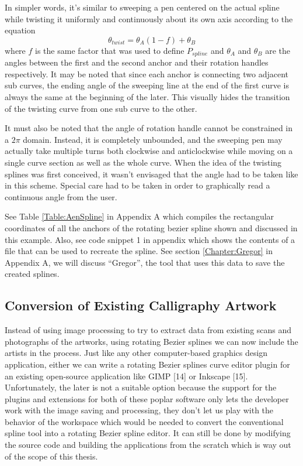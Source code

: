     In simpler words, it’s similar to sweeping a pen centered on the actual spline while twisting it uniformly and continuously about its own axis according to the equation
    \begin{equation}
    \theta_{twist}=\theta_A  (1-f)+ \theta_B
    \end{equation}
    where $f$ is the same factor that was used to define $P_{spline}$ and $\theta_A$ and $\theta_B$ are the angles between the first and the second anchor and their rotation handles respectively. It may be noted that since each anchor is connecting two adjacent sub curves, the ending angle of the sweeping line at the end of the first curve is always the same at the beginning of the later. This visually hides the transition of the twisting curve from one sub curve to the other.

    It must also be noted that the angle of rotation handle cannot be constrained in a $2\pi$ domain. Instead, it is completely unbounded, and the sweeping pen may actually take multiple turns both clockwise and anticlockwise while moving on a single curve section as well as the whole curve. When the idea of the twisting splines was first conceived, it wasn’t envisaged that the angle had to be taken like in this scheme. Special care had to be taken in order to graphically read a continuous angle from the user.

    See Table \ref{Table:AenSpline} in Appendix A which compiles the rectangular coordinates of all the anchors of the rotating bezier spline shown and discussed in this example. Also, see code snippet 1 in appendix which shows the contents of a file that can be used to recreate the spline. See section \ref{Chapter:Gregor} in Appendix A, we will discuss “Gregor”, the tool that uses this data to save the created splines.

\subsection{Conversion of Existing Calligraphy Artwork}
Instead of using image processing to try to extract data from existing scans and photographs of the artworks, using rotating Bezier splines we can now include the artists in the process. Just like any other computer-based graphics design application, either we can write a rotating Bezier splines curve editor plugin for an existing open-source application like GIMP [14] or Inkscape [15]. Unfortunately, the later is not a suitable option because the support for the plugins and extensions for both of these poplar software only lets the developer work with the image saving and processing, they don’t let us play with the behavior of the workspace which would be needed to convert the conventional spline tool into a rotating Bezier spline editor. It can still be done by modifying the source code and building the applications from the scratch which is way out of the scope of this thesis.

